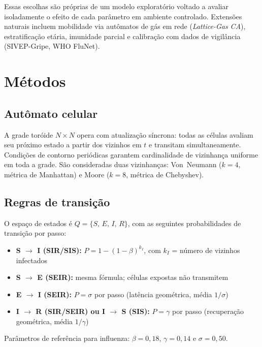 \documentclass[fleqn,10pt]{wlscirep}
\begin{document}
Essas escolhas s\~{a}o pr\'{o}prias de um modelo explorat\'{o}rio voltado a avaliar isoladamente o efeito de cada par\^{a}metro em ambiente controlado. Extens\~{o}es naturais incluem mobilidade via aut\^{o}matos de g\'{a}s em rede (\emph{Lattice-Gas CA}), estratifica\c{c}\~{a}o et\'{a}ria, imunidade parcial e calibra\c{c}\~{a}o com dados de vigilância (SIVEP-Gripe, WHO FluNet).

\section*{M\'{e}todos}

\subsection*{Aut\^{o}mato celular}

A grade tor\'{o}ide $N \times N$ opera com atualiza\c{c}\~{a}o s\'{i}ncrona: todas as c\'{e}lulas avaliam seu pr\'{o}ximo estado a partir dos vizinhos em $t$ e transitam simultaneamente. Condi\c{c}\~{o}es de contorno peri\'{o}dicas garantem cardinalidade de vizinhan\c{c}a uniforme em toda a grade. S\~{a}o consideradas duas vizinhan\c{c}as: Von~Neumann ($k = 4$, m\'{e}trica de Manhattan) e Moore ($k = 8$, m\'{e}trica de Chebyshev).

\subsection*{Regras de transi\c{c}\~{a}o}

O espa\c{c}o de estados \'{e} $Q = \{S,\,E,\,I,\,R\}$, com as seguintes probabilidades de transi\c{c}\~{a}o por passo:
\begin{itemize}
\item \textbf{S $\to$ I (SIR/SIS):} $P = 1-(1-\beta)^{k_I}$, com $k_I$ = n\'{u}mero de vizinhos infectados
\item \textbf{S $\to$ E (SEIR):} mesma f\'{o}rmula; c\'{e}lulas expostas n\~{a}o transmitem
\item \textbf{E $\to$ I (SEIR):} $P = \sigma$ por passo (lat\^{e}ncia geom\'{e}trica, m\'{e}dia $1/\sigma$)
\item \textbf{I $\to$ R (SIR/SEIR) ou I $\to$ S (SIS):} $P = \gamma$ por passo (recupera\c{c}\~{a}o geom\'{e}trica, m\'{e}dia $1/\gamma$)
\end{itemize}
Par\^{a}metros de refer\^{e}ncia para influenza: $\beta = 0{,}18$, $\gamma = 0{,}14$ e $\sigma = 0{,}50$\cite{Biggerstaff:2014}.
\end{document}
